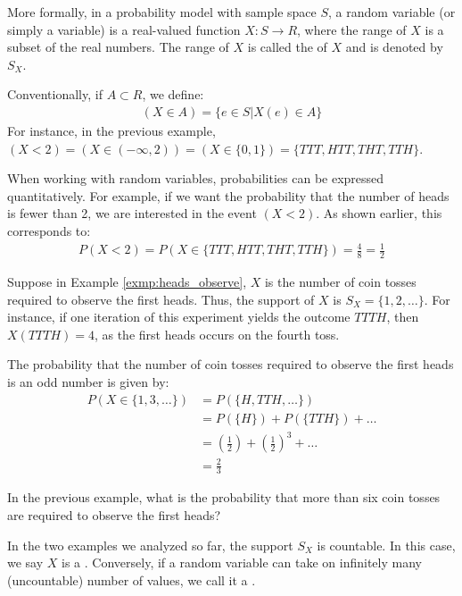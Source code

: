 More formally, in a probability model with sample space \( S \),
a random variable (or simply a variable) is a real-valued function \( X: S \rightarrow R \),
where the range of \( X \) is a subset of the real numbers.
The range of \( X \) is called the  of \( X \) and is denoted by \( S_{X} \).

Conventionally, if \( A \subset R\), we define:
\begin{gather*}
    (X \in A) = \{ e \in S | X(e) \in A \}
\end{gather*}
For instance, in the previous example, \( (X < 2) = (X \in (-\infty, 2)) = (X \in \{ 0, 1 \}) = \{ TTT, HTT, THT, TTH \} \).

When working with random variables, probabilities can be expressed quantitatively.
For example, if we want the probability that the number of heads is fewer than 2, we are interested in the event \( (X < 2) \).
As shown earlier, this corresponds to:
\begin{gather*}
    P(X < 2) = P(X \in \{ TTT, HTT, THT, TTH \}) = \frac{4}{8} = \frac{1}{2}
\end{gather*}

\begin{exmp}
    Suppose in Example \autoref{exmp:heads_observe}, \( X \) is the number of coin tosses required to observe the first heads.
    Thus, the support of \( X \) is \( S_{X} = \{ 1, 2, \ldots \} \).
    For instance, if one iteration of this experiment yields the outcome \( TTTH \),
    then \( X(TTTH) = 4 \), as the first heads occurs on the fourth toss.

    The probability that the number of coin tosses required to observe the first heads is an odd number is given by:
    \begin{align*}
        P(X \in \{ 1, 3, \ldots \}) &= P(\{ H, TTH, \ldots \})\\
        &= P(\{ H \}) + P(\{ TTH \}) + \ldots\\
        &= (\frac{1}{2}) + (\frac{1}{2})^3 + \ldots\\
        &= \frac{2}{3}
    \end{align*}
\end{exmp}

\begin{exmp}
    In the previous example, what is the probability that more than six coin tosses are required to observe the first heads?
\end{exmp}

In the two examples we analyzed so far, the support \( S_{X} \) is countable.
In this case, we say \( X \) is a .
Conversely, if a random variable can take on infinitely many (uncountable) number of values,
we call it a .

